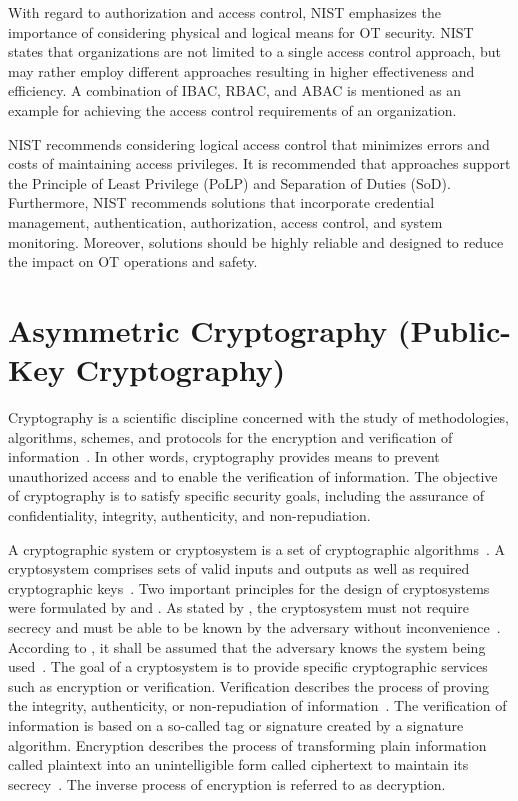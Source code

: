 With regard to authorization and access control, NIST emphasizes the importance of considering physical and logical means for OT security.
NIST states that organizations are not limited to a single access control approach, but may rather employ different approaches resulting in higher effectiveness and efficiency.
A combination of IBAC, RBAC, and ABAC is mentioned as an example for achieving the access control requirements of an organization.

NIST recommends considering logical access control that minimizes errors and costs of maintaining access privileges.
It is recommended that approaches support the Principle of Least Privilege (PoLP) and Separation of Duties (SoD).
Furthermore, NIST recommends solutions that incorporate credential management, authentication, authorization, access control, and system monitoring.
Moreover, solutions should be highly reliable and designed to reduce the impact on OT operations and safety.

\section{Asymmetric Cryptography (Public-Key Cryptography)}
\label{sec:fundamentals:cryptography}
Cryptography is a scientific discipline concerned with the study of methodologies, algorithms, schemes, and protocols for the encryption and verification of information~\cite{Barker2016,Barker2020,CNSS2022}.
In other words, cryptography provides means to prevent unauthorized access and to enable the verification of information.
The objective of cryptography is to satisfy specific security goals, including the assurance of confidentiality, integrity, authenticity, and non-repudiation.

A cryptographic system or cryptosystem is a set of cryptographic algorithms~\cite{Menezes1996}.
A cryptosystem comprises sets of valid inputs and outputs as well as required cryptographic keys~\cite{Eckert2023}.
Two important principles for the design of cryptosystems were formulated by \citeauthor{Kerckhoffs1883} and \citeauthor{Shannon1949}.
As stated by \citeauthor{Kerckhoffs1883}, the cryptosystem must not require secrecy and must be able to be known by the adversary without inconvenience~\cite{Kerckhoffs1883}.
According to \citeauthor{Shannon1949}, it shall be assumed that the adversary knows the system being used~\cite{Shannon1949}.
The goal of a cryptosystem is to provide specific cryptographic services such as encryption or verification.
Verification describes the process of proving the integrity, authenticity, or non-repudiation of information~\cite{Boneh2023}.
The verification of information is based on a so-called tag or signature created by a signature algorithm.
Encryption describes the process of transforming plain information called plaintext into an unintelligible form called ciphertext to maintain its secrecy~\cite{Barker2016,Boneh2023}.
The inverse process of encryption is referred to as decryption.

